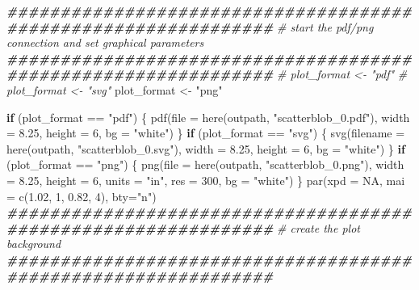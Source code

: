 \documentclass[
  11pt,
]{article}
\newenvironment{Shaded}{\begin{snugshade}}{\end{snugshade}}
\newcommand{\AttributeTok}[1]{\textcolor[rgb]{0.77,0.63,0.00}{#1}}
\newcommand{\CommentTok}[1]{\textcolor[rgb]{0.56,0.35,0.01}{\textit{#1}}}
\newcommand{\ConstantTok}[1]{\textcolor[rgb]{0.00,0.00,0.00}{#1}}
\newcommand{\ControlFlowTok}[1]{\textcolor[rgb]{0.13,0.29,0.53}{\textbf{#1}}}
\newcommand{\DecValTok}[1]{\textcolor[rgb]{0.00,0.00,0.81}{#1}}
\newcommand{\DocumentationTok}[1]{\textcolor[rgb]{0.56,0.35,0.01}{\textbf{\textit{#1}}}}
\newcommand{\FloatTok}[1]{\textcolor[rgb]{0.00,0.00,0.81}{#1}}
\newcommand{\FunctionTok}[1]{\textcolor[rgb]{0.00,0.00,0.00}{#1}}
\newcommand{\NormalTok}[1]{#1}
\newcommand{\OtherTok}[1]{\textcolor[rgb]{0.56,0.35,0.01}{#1}}
\newcommand{\SpecialCharTok}[1]{\textcolor[rgb]{0.00,0.00,0.00}{#1}}
\newcommand{\StringTok}[1]{\textcolor[rgb]{0.31,0.60,0.02}{#1}}
\begin{document}
\begin{Shaded}
\begin{Highlighting}[]
\DocumentationTok{\#\#\#\#\#\#\#\#\#\#\#\#\#\#\#\#\#\#\#\#\#\#\#\#\#\#\#\#\#\#\#\#\#\#\#\#\#\#\#\#\#\#\#\#\#\#\#\#\#\#\#\#\#\#\#\#\#\#\#\#\#\#\#}
\CommentTok{\# start the pdf/png connection and set graphical parameters}
\DocumentationTok{\#\#\#\#\#\#\#\#\#\#\#\#\#\#\#\#\#\#\#\#\#\#\#\#\#\#\#\#\#\#\#\#\#\#\#\#\#\#\#\#\#\#\#\#\#\#\#\#\#\#\#\#\#\#\#\#\#\#\#\#\#\#\#}
\CommentTok{\# plot\_format \textless{}{-} "pdf"}
\CommentTok{\# plot\_format \textless{}{-} "svg"}
\NormalTok{ plot\_format }\OtherTok{\textless{}{-}} \StringTok{"png"}

\ControlFlowTok{if}\NormalTok{ (plot\_format }\SpecialCharTok{==} \StringTok{"pdf"}\NormalTok{) \{}
  \FunctionTok{pdf}\NormalTok{(}\AttributeTok{file =} \FunctionTok{here}\NormalTok{(outpath, }\StringTok{"scatterblob\_0.pdf"}\NormalTok{),}
      \AttributeTok{width =} \FloatTok{8.25}\NormalTok{,}
      \AttributeTok{height =} \DecValTok{6}\NormalTok{,}
      \AttributeTok{bg =} \StringTok{"white"}\NormalTok{)  }
\NormalTok{\}}
\ControlFlowTok{if}\NormalTok{ (plot\_format }\SpecialCharTok{==} \StringTok{"svg"}\NormalTok{) \{}
  \FunctionTok{svg}\NormalTok{(}\AttributeTok{filename =} \FunctionTok{here}\NormalTok{(outpath, }\StringTok{"scatterblob\_0.svg"}\NormalTok{),}
      \AttributeTok{width =} \FloatTok{8.25}\NormalTok{,}
      \AttributeTok{height =} \DecValTok{6}\NormalTok{,}
      \AttributeTok{bg =} \StringTok{"white"}\NormalTok{)  }
\NormalTok{\}}
\ControlFlowTok{if}\NormalTok{ (plot\_format }\SpecialCharTok{==} \StringTok{"png"}\NormalTok{) \{}
  \FunctionTok{png}\NormalTok{(}\AttributeTok{file =} \FunctionTok{here}\NormalTok{(outpath, }\StringTok{"scatterblob\_0.png"}\NormalTok{),}
      \AttributeTok{width =} \FloatTok{8.25}\NormalTok{,}
      \AttributeTok{height =} \DecValTok{6}\NormalTok{,}
      \AttributeTok{units =} \StringTok{"in"}\NormalTok{,}
      \AttributeTok{res =} \DecValTok{300}\NormalTok{,}
      \AttributeTok{bg =} \StringTok{"white"}\NormalTok{)  }
\NormalTok{\}}
\FunctionTok{par}\NormalTok{(}\AttributeTok{xpd =} \ConstantTok{NA}\NormalTok{,}
    \AttributeTok{mai =} \FunctionTok{c}\NormalTok{(}\FloatTok{1.02}\NormalTok{, }\DecValTok{1}\NormalTok{, }\FloatTok{0.82}\NormalTok{, }\DecValTok{4}\NormalTok{),}
    \AttributeTok{bty=}\StringTok{"n"}\NormalTok{)}
\DocumentationTok{\#\#\#\#\#\#\#\#\#\#\#\#\#\#\#\#\#\#\#\#\#\#\#\#\#\#\#\#\#\#\#\#\#\#\#\#\#\#\#\#\#\#\#\#\#\#\#\#\#\#\#\#\#\#\#\#\#\#\#\#\#\#\#}
\CommentTok{\# create the plot background}
\DocumentationTok{\#\#\#\#\#\#\#\#\#\#\#\#\#\#\#\#\#\#\#\#\#\#\#\#\#\#\#\#\#\#\#\#\#\#\#\#\#\#\#\#\#\#\#\#\#\#\#\#\#\#\#\#\#\#\#\#\#\#\#\#\#\#\#}

\end{Highlighting}
\end{Shaded}
\end{document}
